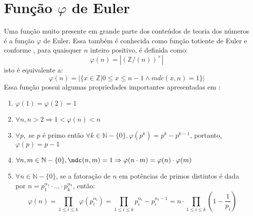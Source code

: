 
\section{Função $\varphi$ de Euler}

Uma função muito presente em grande parte dos conteúdos de teoria dos números é a função $\varphi$ de Euler. Essa também é conhecida como função totiente de Euler e conforme \cite[p.~48]{book:2399854}, para quaisquer $n$ inteiro positivo, é definida como:
    \begin{equation} \label{def:phi}
        \varphi(n) = |(\mathbb{Z}/(n))^{\times}|
    \end{equation}
isto é equivalente a:
    \begin{equation}
        \varphi(n) = |\{x \in \mathbb{Z} | 0 \leq x \leq n-1 \land mdc(x,n) = 1 \}|
    \end{equation}
Essa função possui algumas propriedades importantes apresentadas em \cite[p.~48-49]{book:2399854}:
    \begin{enumerate}
    \item $\varphi(1) = \varphi(2) = 1$
    \item \label{item:prop-phi-2} $\forall n, n > 2 \Rightarrow 1 < \varphi(n) < n$
    \item \label{item:prop-phi-3} $\forall p,$ se $p$ é primo então $\forall k \in \mathbb{N} - \{0\}, \varphi(p^k) = p^k - p^{k-1}$, portanto, $\varphi(p) = p - 1$
    \item \label{item:prop-phi-4} $\forall n, m \in \mathbb{N} - \{0\}, \mdc(n, m) = 1 \Rightarrow \varphi(n \cdot m) = \varphi(n) \cdot \varphi(m) $
    \item \label{item:prop-phi-5} $\forall n \in \mathbb{N} - \{0\}$, se a fatoração de $n$ em potências de primos distintos é dada por $n = p_{1}^{\alpha_{1}} \cdot ... \cdot p_{k}^{\alpha_{k}}$, então:
        \begin{equation} \label{lema:phi-formula}
            \varphi(n) = \prod_{1 \leq i \leq k} \varphi(p_{i}^{\alpha_{i}}) = \prod_{1 \leq i \leq k} p_{i}^{\alpha_{i}} - p_{i}^{\alpha_{i} - 1} = n \cdot \prod_{1 \leq i \leq k} \left( 1 - \frac{1}{p_{i}} \right)
        \end{equation}
    \end{enumerate}


